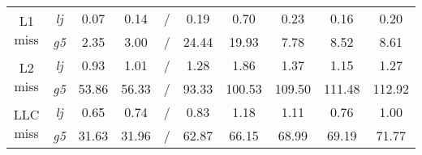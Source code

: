 \begin{table}[h!]
\begin{tabular}{|ccccc|ccccc|}
\multicolumn{1}{|c|}{\multirow{2}{*}{L1 miss}}            & \multicolumn{1}{c|}{\emph{lj}}            & \multicolumn{1}{c|}{0.07}                          & \multicolumn{1}{c|}{0.14}                             & /                            & \multicolumn{1}{c|}{0.19}       & \multicolumn{1}{c|}{0.70}        & \multicolumn{1}{c|}{0.23}                         & \multicolumn{1}{c|}{0.16}       & 0.20        \\ \cline{2-10} 
\multicolumn{1}{|c|}{}                                    & \multicolumn{1}{c|}{\emph{g5}}            & \multicolumn{1}{c|}{2.35}                          & \multicolumn{1}{c|}{3.00}                             & /                            & \multicolumn{1}{c|}{24.44}      & \multicolumn{1}{c|}{19.93}       & \multicolumn{1}{c|}{7.78}                         & \multicolumn{1}{c|}{8.52}       & 8.61        \\ \hline
\multicolumn{1}{|c|}{\multirow{2}{*}{L2 miss}}            & \multicolumn{1}{c|}{\emph{lj}}            & \multicolumn{1}{c|}{0.93}                          & \multicolumn{1}{c|}{1.01}                             & /                            & \multicolumn{1}{c|}{1.28}       & \multicolumn{1}{c|}{1.86}        & \multicolumn{1}{c|}{1.37}                         & \multicolumn{1}{c|}{1.15}       & 1.27        \\ \cline{2-10} 
\multicolumn{1}{|c|}{}                                    & \multicolumn{1}{c|}{\emph{g5}}            & \multicolumn{1}{c|}{53.86}                         & \multicolumn{1}{c|}{56.33}                            & /                            & \multicolumn{1}{c|}{93.33}      & \multicolumn{1}{c|}{100.53}      & \multicolumn{1}{c|}{109.50}                       & \multicolumn{1}{c|}{111.48}     & 112.92      \\ \hline
\multicolumn{1}{|c|}{\multirow{2}{*}{LLC miss}}           & \multicolumn{1}{c|}{\emph{lj}}            & \multicolumn{1}{c|}{0.65}                          & \multicolumn{1}{c|}{0.74}                             & /                            & \multicolumn{1}{c|}{0.83}       & \multicolumn{1}{c|}{1.18}        & \multicolumn{1}{c|}{1.11}                         & \multicolumn{1}{c|}{0.76}       & 1.00        \\ \cline{2-10} 
\multicolumn{1}{|c|}{}                                    & \multicolumn{1}{c|}{\emph{g5}}            & \multicolumn{1}{c|}{31.63}                         & \multicolumn{1}{c|}{31.96}                            & /                            & \multicolumn{1}{c|}{62.87}      & \multicolumn{1}{c|}{66.15}       & \multicolumn{1}{c|}{68.99}                        & \multicolumn{1}{c|}{69.19}      & 71.77       \\ \hline

\end{tabular}
\end{table}
